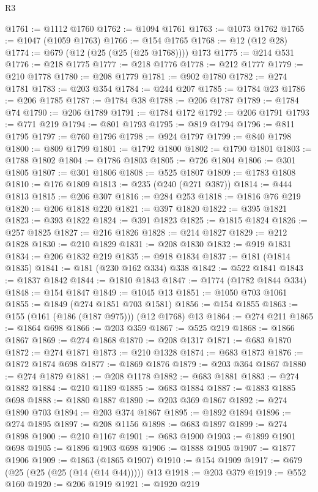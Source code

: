 \begin{lexlean}{R3}
\begin{coremodule}
@1761 := @1112 @1760
@1762 := @1094 @1761
@1763 := @1073 @1762
@1765 := @1047 (@1059 @1763)
@1766 := @154 @1765
@1768 := @12 (@12 @28)
@1774 := @679 (@12 (@25 (@25 (@25 @1768)))) @173
@1775 := @214 @531
@1776 := @218 @1775
@1777 := @218 @1776
@1778 := @212 @1777
@1779 := @210 @1778
@1780 := @208 @1779
@1781 := @902 @1780
@1782 := @274 @1781
@1783 := @203 @354
@1784 := @244 @207
@1785 := @1784 @23
@1786 := @206 @1785
@1787 := @1784 @38
@1788 := @206 @1787
@1789 := @1784 @74
@1790 := @206 @1789
@1791 := @1784 @172
@1792 := @206 @1791
@1793 := @771 @219
@1794 := @801 @1793
@1795 := @819 @1794
@1796 := @811 @1795
@1797 := @760 @1796
@1798 := @924 @1797
@1799 := @840 @1798
@1800 := @809 @1799
@1801 := @1792 @1800
@1802 := @1790 @1801
@1803 := @1788 @1802
@1804 := @1786 @1803
@1805 := @726 @1804
@1806 := @301 @1805
@1807 := @301 @1806
@1808 := @525 @1807
@1809 := @1783 @1808
@1810 := @176 @1809
@1813 := @235 (@240 (@271 @387))
@1814 := @444 @1813
@1815 := @206 @307
@1816 := @284 @253
@1818 := @1816 @76 @219
@1820 := @206 @1818 @220
@1821 := @397 @1820
@1822 := @395 @1821
@1823 := @393 @1822
@1824 := @391 @1823
@1825 := @1815 @1824
@1826 := @257 @1825
@1827 := @216 @1826
@1828 := @214 @1827
@1829 := @212 @1828
@1830 := @210 @1829
@1831 := @208 @1830
@1832 := @919 @1831
@1834 := @206 @1832 @219
@1835 := @918 @1834
@1837 := @181 (@1814 @1835)
@1841 := @181 (@230 @162 @334) @338
@1842 := @522 @1841
@1843 := @1837 @1842
@1844 := @1810 @1843
@1847 := @1774 (@1782 @1844 @334)
@1848 := @154 @1847
@1849 := @1045 @13
@1851 := @1050 @703 @1061
@1855 := @1849 (@274 @1851 @703 @1581)
@1856 := @154 @1855
@1863 := @155 (@161 (@186 (@187 @975))) (@12 @1768) @13
@1864 := @274 @211
@1865 := @1864 @698
@1866 := @203 @359
@1867 := @525 @219
@1868 := @1866 @1867
@1869 := @274 @1868
@1870 := @208 @1317
@1871 := @683 @1870
@1872 := @274 @1871
@1873 := @210 @1328
@1874 := @683 @1873
@1876 := @1872 @1874 @698
@1877 := @1869 @1876
@1879 := @203 @364 @1867
@1880 := @274 @1879
@1881 := @208 @1178
@1882 := @683 @1881
@1883 := @274 @1882
@1884 := @210 @1189
@1885 := @683 @1884
@1887 := @1883 @1885 @698
@1888 := @1880 @1887
@1890 := @203 @369 @1867
@1892 := @274 @1890 @703
@1894 := @203 @374 @1867
@1895 := @1892 @1894
@1896 := @274 @1895
@1897 := @208 @1156
@1898 := @683 @1897
@1899 := @274 @1898
@1900 := @210 @1167
@1901 := @683 @1900
@1903 := @1899 @1901 @698
@1905 := @1896 @1903 @698
@1906 := @1888 @1905
@1907 := @1877 @1906
@1909 := @1863 (@1865 @1907)
@1910 := @154 @1909
@1917 := @679 (@25 (@25 (@25 (@14 (@14 @44))))) @13
@1918 := @203 @379
@1919 := @552 @160
@1920 := @206 @1919
@1921 := @1920 @219

\end{coremodule}
\end{lexlean}
